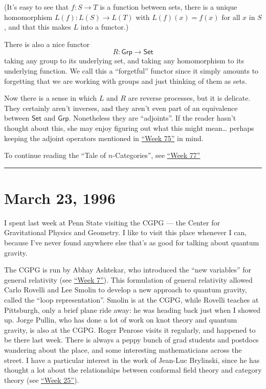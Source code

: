 \documentclass{article}
\begin{document}
(It's easy to see that \(f\colon S\to T\) is a function between sets,
there is a unique homomorphism \(L(f)\colon L(S)\to L(T)\) with
\(L(f)(x) = f(x)\) for all \(x\) in \(S\), and that this makes \(L\)
into a functor.)

There is also a nice functor \[R\colon\mathsf{Grp}\to\mathsf{Set}\]
taking any group to its underlying set, and taking any homomorphism to
its underlying function. We call this a ``forgetful'' functor since it
simply amounts to forgetting that we are working with groups and just
thinking of them as sets.

Now there is a sense in which \(L\) and \(R\) are reverse processes, but
it is delicate. They certainly aren't inverses, and they aren't even
part of an equivalence between \(\mathsf{Set}\) and \(\mathsf{Grp}\).
Nonetheless they are ``adjoints''. If the reader hasn't thought about
this, she may enjoy figuring out what this might mean\ldots{} perhaps
keeping the adjoint operators mentioned in
\protect\hyperlink{week75}{``Week 75''} in mind.

To continue reading the ``Tale of \(n\)-Categories'', see
\protect\hyperlink{week77}{``Week 77''}

\begin{center}\rule{0.5\linewidth}{0.5pt}\end{center}



\hypertarget{week77}{%
\section{March 23, 1996}\label{week77}}

I spent last week at Penn State visiting the CGPG --- the Center for
Gravitational Physics and Geometry. I like to visit this place whenever
I can, because I've never found anywhere else that's as good for talking
about quantum gravity.

The CGPG is run by Abhay Ashtekar, who introduced the ``new variables''
for general relativity (see \protect\hyperlink{week7}{``Week 7''}). This
formulation of general relativity allowed Carlo Rovelli and Lee Smolin
to develop a new approach to quantum gravity, called the ``loop
representation''. Smolin is at the CGPG, while Rovelli teaches at
Pittsburgh, only a brief plane ride away: he was heading back just when
I showed up. Jorge Pullin, who has done a lot of work on knot theory and
quantum gravity, is also at the CGPG. Roger Penrose visits it regularly,
and happened to be there last week. There is always a peppy bunch of
grad students and postdocs wandering about the place, and some
interesting mathematicians across the street. I have a particular
interest in the work of Jean-Luc Brylinski, since he has thought a lot
about the relationships between conformal field theory and category
theory (see \protect\hyperlink{week25}{``Week 25''}).
\end{document}
